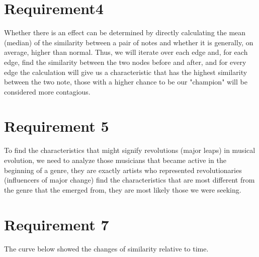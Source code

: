 \documentclass{article}
\begin{document}
\section{Requirement4}\Large
Whether there is an effect can be determined by directly calculating the mean (median) of the similarity between a pair  of notes and whether it is generally,
on average, higher than normal. Thus, we will iterate over each edge and, for each edge, find the similarity between the two nodes before and after, and for every
edge the calculation will give us a characteristic that has the highest similarity between the two note, those with a higher chance to be our "champion" will be considered
more contagious.
\section{Requirement 5}
To find the characteristics that might signify revolutions (major leaps) in musical evolution, we need to analyze those musicians that became active in the beginning of
a genre, they are exactly artists who represented revolutionaries (influencers of major
change) find the characteristics that are most different from the genre that the emerged from, they are most likely those we were seeking.
\section{Requirement 7}
The curve below showed the changes of similarity relative to time.
\end{document}
